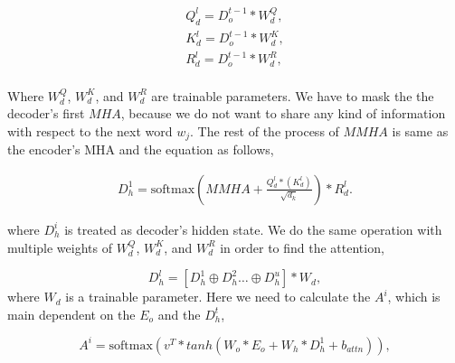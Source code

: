 \documentclass[preprint,review,12pt]{elsarticle}
\begin{document}
\begin{equation}  \label{eq8}
	\begin{aligned}
	Q_{d}^l= D_{o}^{t-1} * W_{d}^Q, \\
	K_{d}^l= D_{o}^{t-1} * W_{d}^K, \\
	R_{d}^l= D_{o}^{t-1} * W_{d}^R,\\
\end{aligned}
\end{equation}
 
Where $W_{d}^Q$, $W_{d}^K$, and $W_{d}^R$ are trainable parameters. We have to mask the the decoder's first $MHA$, because we do not want to share any kind of information with respect to the next word $w_j$. The rest of the process of $MMHA$ is same as the encoder's MHA and the equation as follows,



\begin{equation}
	\begin{aligned}
		D_h^1 = \text{softmax}\left( MMHA + \frac{Q_d^l * (K_d^l)}{\sqrt{d_k}}\right)*R_d^l.
	\end{aligned}
\end{equation}

where $D_h^i$ is treated as decoder's hidden state. We do the same operation with multiple weights of $W_{d}^Q$, $W_{d}^K$, and $W_{d}^R$ in order to find the attention,

\begin{equation}
	D_h^l = [D_h^1 \oplus D_h^2 \ldots \oplus D_h^u] * W_d,
\end{equation}
where $W_d$ is a trainable parameter. Here we need to calculate the $A^i$, which is main dependent on the $E_o$ and the $D_h^t$,


\begin{equation}
	A^i = \text{softmax}\left(v^T * tanh(W_o*E_o + W_h*D_h^1 + b_{attn})\right),
\end{equation}
\end{document}

